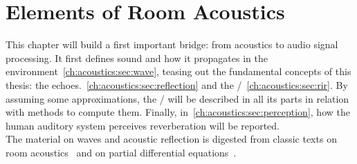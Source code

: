 \chapter{Elements of Room Acoustics}\label{chap:acoustics}
\vspace{-2.5em}
This chapter will build a first important bridge: from acoustics to audio signal processing.
It first defines sound and how it propagates in the environment~\cref{ch:acoustics:sec:wave}, teasing out the fundamental concepts of this thesis: the echoes.~\cref{ch:acoustics:sec:reflection} and the \RIRdef/~\cref{ch:acoustics:sec:rir}.
By assuming some approximations, the \RIR/ will be described in all its parts in relation with methods to compute them.
Finally, in~\cref{ch:acoustics:sec:perception}, how the human auditory system perceives reverberation will be reported.
\\The material on waves and acoustic reflection is digested from classic texts on room acoustics~ and on partial differential equations~.

